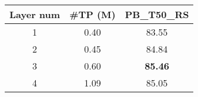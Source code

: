 \begin{table*}
{\begin{subtable}[t]{0.24\linewidth}
        \begin{tabularx}{\textwidth}{ccc}
            \toprule
            Layer num & \#TP (M) & PB\_T50\_RS \\
            \midrule
            1 & 0.40 & 83.55 \\
            2 & 0.45 & 84.84 \\
            \rowcolor{linecolor!40}3 & 0.60 & \textbf{85.46} \\
            4 & 1.09 & 85.05 \\
            \bottomrule
        \end{tabularx}
    \end{subtable}
}
\end{table*}